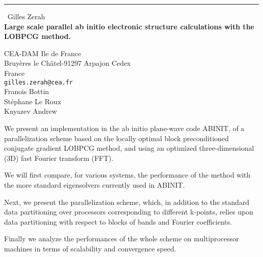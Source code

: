 \documentclass{report}
\begin{document}
\begin{center}
\rule{6in}{1pt} \
{\large Gilles Zerah \\
{\bf Large scale parallel ab initio electronic structure calculations with the LOBPCG method.}}

CEA-DAM Ile de France \\ Bruy{\`e}res le Ch{\^a}tel-91297 Arpajon Cedex \\ France
\\
{\tt gilles.zerah@cea.fr}\\
Fran{\cc}ois Bottin\\
St{\'e}phane Le Roux\\
	Knyazev Andrew\end{center}

We present an implementation in the ab initio plane-wave code ABINIT, of
a parallelization scheme based on the locally optimal block
preconditioned conjugate gradient LOBPCG method, and using an optimized
three-dimensional (3D) fast Fourier transform (FFT).

We will first compare, for various systems, the performance of the method
with the more standard eigensolvers currently used in ABINIT.

Next, we present the parallelization scheme, which, in addition to the
standard data partitioning over processors corresponding to different
k-points, relies upon data partitioning with respect to blocks of bands
and Fourier coefficients.

Finally we analyze the performances of the whole scheme on multiprocessor
machines in terms of scalability and convergence speed.
\end{document}
